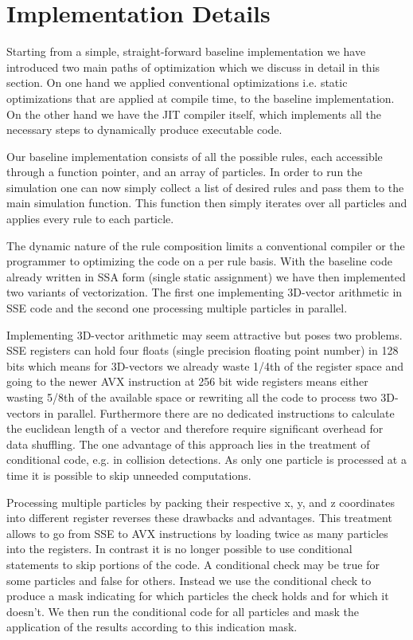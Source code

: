 \section{Implementation Details}\label{sec:method}

Starting from a simple, straight-forward baseline implementation we have introduced two main paths of optimization which we discuss in detail in this section. On one hand we applied conventional optimizations i.e. static optimizations that are applied at compile time, to the baseline implementation. On the other hand we have the JIT compiler itself, which implements all the necessary steps to dynamically produce executable code.

Our baseline implementation consists of all the possible rules, each accessible through a function pointer, and an array of particles. In order to run the simulation one can now simply collect a list of desired rules and pass them to the main simulation function. This function then simply iterates over all particles and applies every rule to each particle.

The dynamic nature of the rule composition limits a conventional compiler or the programmer to optimizing the code on a per rule basis. With the baseline code already written in SSA form (single static assignment) we have then implemented two variants of vectorization. The first one implementing 3D-vector arithmetic in SSE code and the second one processing multiple particles in parallel.

Implementing 3D-vector arithmetic may seem attractive but poses two problems. SSE registers can hold four floats (single precision floating point number) in 128 bits which means for 3D-vectors we already waste 1/4th of the register space and going to the newer AVX instruction at 256 bit wide registers means either wasting 5/8th of the available space or rewriting all the code to process two 3D-vectors in parallel. Furthermore there are no dedicated instructions to calculate the euclidean length of a vector and therefore require significant overhead for data shuffling. The one advantage of this approach lies in the treatment of conditional code, e.g. in collision detections. As only one particle is processed at a time it is possible to skip unneeded computations.

Processing multiple particles by packing their respective x, y, and z coordinates into different register reverses these drawbacks and advantages. This treatment allows to go from SSE to AVX instructions by loading twice as many particles into the registers. In contrast it is no longer possible to use conditional statements to skip portions of the code. A conditional check may be true for some particles and false for others. Instead we use the conditional check to produce a mask indicating for which particles the check holds and for which it doesn't. We then run the conditional code for all particles and mask the application of the results according to this indication mask.

